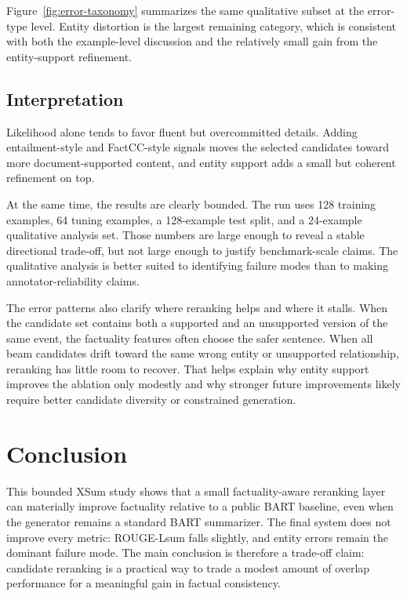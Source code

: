 \documentclass[11pt]{article}
\begin{document}
Figure~\ref{fig:error-taxonomy} summarizes the same qualitative subset at the
error-type level. Entity distortion is the largest remaining category, which is
consistent with both the example-level discussion and the relatively small gain
from the entity-support refinement.

\subsection{Interpretation}

Likelihood alone tends to favor fluent but overcommitted details. Adding
entailment-style and FactCC-style signals moves the selected candidates toward
more document-supported content, and entity support adds a small but coherent
refinement on top.

At the same time, the results are clearly bounded. The run uses 128 training
examples, 64 tuning examples, a 128-example test split, and a 24-example
qualitative analysis set. Those numbers are large enough to reveal a stable
directional trade-off, but not large enough to justify benchmark-scale claims.
The qualitative analysis is better suited to identifying failure modes than to
making annotator-reliability claims.

The error patterns also clarify where reranking helps and where it stalls.
When the candidate set contains both a supported and an unsupported version of
the same event, the factuality features often choose the safer sentence. When
all beam candidates drift toward the same wrong entity or unsupported
relationship, reranking has little room to recover. That helps explain why
entity support improves the ablation only modestly and why stronger future
improvements likely require better candidate diversity or constrained
generation.

\section{Conclusion}

This bounded XSum study shows that a small factuality-aware reranking layer can
materially improve factuality relative to a public BART baseline, even when the
generator remains a standard BART summarizer. The final system does not improve
every metric: ROUGE-Lsum falls slightly, and entity errors remain the dominant
failure mode. The main conclusion is therefore a trade-off claim: candidate
reranking is a practical way to trade a modest amount of overlap performance
for a meaningful gain in factual consistency.
\end{document}
